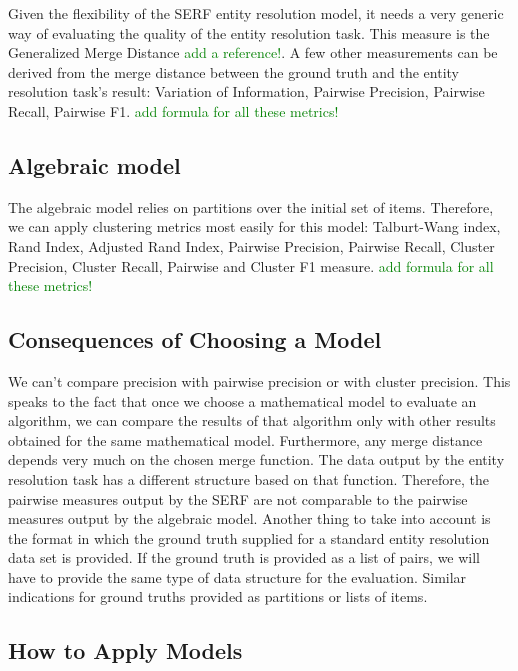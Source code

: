 \documentclass[11pt]{article}
\begin{document}
    Given the flexibility of the SERF entity resolution model, it needs a very generic way of evaluating the quality of the entity resolution task. This measure is the Generalized Merge Distance \textcolor{green}{add a reference!}. A few other measurements can be derived from the merge distance between the ground truth and the entity resolution task's result: Variation of Information, Pairwise Precision, Pairwise Recall, Pairwise F1. 
    \textcolor{green}{add formula for all these metrics!}

    \subsection[algebraic]{Algebraic model}\label{subsec:algebraic-model}

    The algebraic model relies on partitions over the initial set of items. Therefore, we can apply clustering metrics most easily for this model: Talburt-Wang index, Rand Index, Adjusted Rand Index, Pairwise Precision, Pairwise Recall, Cluster Precision, Cluster Recall, Pairwise and Cluster F1 measure.
    \textcolor{green}{add formula for all these metrics!}

    \subsection[why-bother]{Consequences of Choosing a Model}\label{subsec:why-bother}

    We can't compare precision with pairwise precision or with cluster precision. This speaks to the fact that once we choose a mathematical model to evaluate an algorithm, we can compare the results of that algorithm only with other results obtained for the same mathematical model. Furthermore, any merge distance depends very much on the chosen merge function. The data output by the entity resolution task has a different structure based on that function. Therefore, the pairwise measures output by the SERF are not comparable to the pairwise measures output by the algebraic model. Another thing to take into account is the format in which the ground truth supplied for a standard entity resolution data set is provided. If the ground truth is provided as a list of pairs, we will have to provide the same type of data structure for the evaluation. Similar indications for ground truths provided as partitions or lists of items.

    \subsection[applying]{How to Apply Models}\label{sub-sec:applying}
\end{document}
